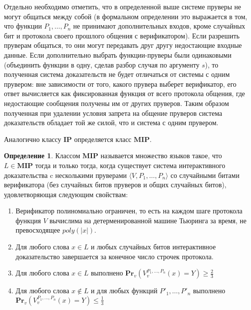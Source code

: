 \documentclass{mipt-thesis-bs}
\theoremstyle{plain}
\theoremstyle{definition}
\newtheorem{definition}{Определение}
\newcommand{\poly}{\textit{poly}}
\newcommand{\pr}[2]{\textbf{Pr}_{#1}\left(#2\right)}
\begin{document}
Отдельно необходимо отметить, что в определенной выше системе пруверы не могут общаться между собой (в формальном определении это выражается в том, что функции $P_1, \dots, P_n$ не принимают дополнительных входов, кроме случайных бит и протокола своего прошлого общения с верификатором). Если разрешить пруверам общаться, то они могут передавать друг другу недостающие входные данные. Если дополнительно выбрать функции-пруверы были одинаковыми (объединить функции в одну, сделав разбор случая по аргументу $s$), то полученная система доказательств не будет отличаться от системы с одним прувером: вне зависимости от того, какого прувера выберет верификатор, его ответ вычисляется как фиксированная функция от всего протокола общения, где недостающие сообщения получены им от других пруверов. Таким образом полученная при удалении условия запрета на общение пруверов система доказательств обладает той же силой, что и система с одним прувером.

Аналогично классу $\textbf{IP}$ определяется класс $\textbf{MIP}$.

\begin{definition}\label{mip}
Классом $\textbf{MIP}$ называется множество языков такое, что $L \in \textbf{MIP}$ тогда и только тогда, когда существует система интерактивного доказательства c несколькими пруверами $\langle V, P_1, \ldots, P_n\rangle$ со случайными битами верификатора (без случайных битов пруверов и общих случайных битов), удовлетворяющая следующим свойствам:
\begin{enumerate}
    \item Верификатор полиномиально ограничен, то есть на каждом шаге протокола функция $V$ вычислима на детерменированной машине Тьюринга за время, не превосходящее $\poly(|x|)$.
    \item Для любого слова $x \in L$ и любых случайных битов интерактивное доказательство завершается за конечное число строчек протокола.
    \item Для любого слова $x \in L$ выполнено $\pr{v}{V^{P_1, \ldots, P_n}_{v}(x) = Y} \geq \frac{2}{3}$
    \item Для любого слова $x \notin L$ и для любых функций $P'_1, \ldots, P'_n$ выполнено\\$\pr{v}{V^{P_1, \ldots, P_n}_{v}(x) = Y} \leq \frac{1}{3}$
\end{enumerate}
\end{definition}
\end{document}
